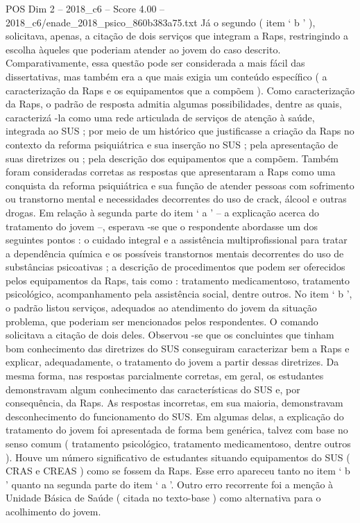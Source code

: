 \begin{textsample}{POS Dim 2 – 2018\_c6 – Score 4.00 – 2018\_c6/enade\_2018\_psico\_860b383a75.txt}
Já o segundo ( item ‘ b ’ ), solicitava, apenas, a citação de dois serviços que integram a Raps, restringindo a escolha àqueles que poderiam atender ao jovem do caso descrito.
Comparativamente, essa questão pode ser considerada a mais fácil das dissertativas, mas também era a que mais exigia um conteúdo específico ( a caracterização da Raps e os equipamentos que a compõem ).
Como caracterização da Raps, o padrão de resposta admitia algumas possibilidades, dentre as quais, caracterizá -la como uma rede articulada de serviços de atenção à saúde, integrada ao SUS ; por meio de um histórico que justificasse a criação da Raps no contexto da reforma psiquiátrica e sua inserção no SUS ; pela apresentação de suas diretrizes ou ; pela descrição dos equipamentos que a compõem.
Também foram consideradas corretas as respostas que apresentaram a Raps como uma conquista da reforma psiquiátrica e sua função de atender pessoas com sofrimento ou transtorno mental e necessidades decorrentes do uso de crack, álcool e outras drogas.
Em relação à segunda parte do item ‘ a ’ – a explicação acerca do tratamento do jovem –, esperava -se que o respondente abordasse um dos seguintes pontos : o cuidado integral e a assistência multiprofissional para tratar a dependência química e os possíveis transtornos mentais decorrentes do uso de substâncias psicoativas ; a descrição de procedimentos que podem ser oferecidos pelos equipamentos da Raps, tais como : tratamento medicamentoso, tratamento psicológico, acompanhamento pela assistência social, dentre outros.
No item ‘ b ’, o padrão listou serviços, adequados ao atendimento do jovem da situação problema, que poderiam ser mencionados pelos respondentes.
O comando solicitava a citação de dois deles.
Observou -se que os concluintes que tinham bom conhecimento das diretrizes do SUS conseguiram caracterizar bem a Raps e explicar, adequadamente, o tratamento do jovem a partir dessas diretrizes.
Da mesma forma, nas respostas parcialmente corretas, em geral, os estudantes demonstravam algum conhecimento das características do SUS e, por consequência, da Raps.
As respostas incorretas, em sua maioria, demonstravam desconhecimento do funcionamento do SUS.
Em algumas delas, a explicação do tratamento do jovem foi apresentada de forma bem genérica, talvez com base no senso comum ( tratamento psicológico, tratamento medicamentoso, dentre outros ).
Houve um número significativo de estudantes situando equipamentos do SUS ( CRAS e CREAS ) como se fossem da Raps.
Esse erro apareceu tanto no item ‘ b ’ quanto na segunda parte do item ‘ a ’.
Outro erro recorrente foi a menção à Unidade Básica de Saúde ( citada no texto-base ) como alternativa para o acolhimento do jovem.

\end{textsample}

